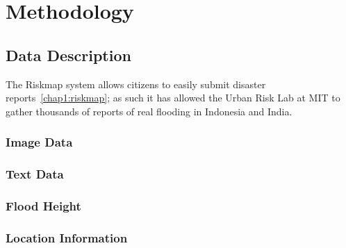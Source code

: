 \chapter{Methodology}
\section{Data Description}
The Riskmap system allows citizens to easily submit
disaster reports~\ref{chap1:riskmap}; as such it has allowed the Urban Risk Lab at
MIT to gather thousands of reports of real flooding in Indonesia and India.

\subsection{Image Data}

\subsection{Text Data}
\subsection{Flood Height}
\subsection{Location Information}
